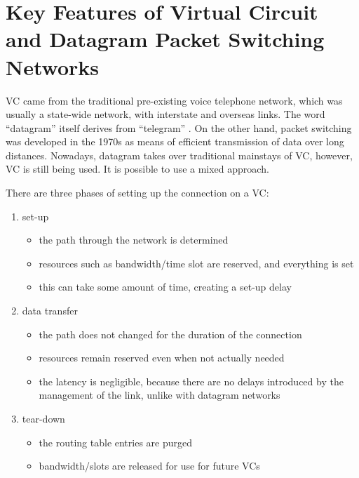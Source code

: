 \documentclass[10pt]{report}
\begin{document}
\chapter{Key Features of Virtual Circuit and Datagram Packet Switching Networks}
\thispagestyle{fancy}




VC came from the traditional pre-existing voice telephone network, which
was usually a state-wide network, with interstate and overseas links.
The word ``datagram'' itself derives from ``telegram'' \cite[p141]{russell}.  On
the other hand, packet switching was developed in the 1970s as means of
efficient transmission of data over long distances.  Nowadays, datagram takes over traditional mainstays of VC, however, VC is still being used.  It is possible to use a mixed approach.

There are three phases of setting up the connection on a VC:

\begin{enumerate}
\item set-up
    \begin{itemize}
    \item the path through the network is determined
    \item resources such as bandwidth/time slot are reserved, and everything is set
    \item this can take some amount of time, creating a set-up delay
    \end{itemize}
\item data transfer
    \begin{itemize}
    \item the path does not changed for the duration of the connection
    \item resources remain reserved even when not actually needed
    \item the latency is negligible, because there are no delays introduced by the management of the link, unlike with datagram networks
    \end{itemize}
\item tear-down
    \begin{itemize}
	\item the routing table entries are purged
	\item bandwidth/slots are released for use for future VCs
    \end{itemize}
\end{enumerate}
\end{document}
